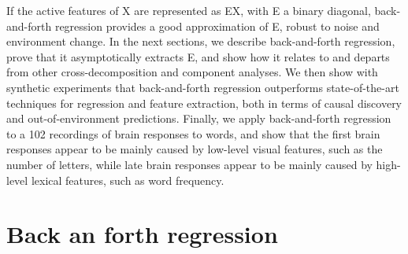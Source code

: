 \documentclass{article}
\begin{document}
%
If the active features of X are represented as EX, with E a binary diagonal, back-and-forth regression provides a good approximation of E, robust to noise and environment change.
%
In the next sections, we describe back-and-forth regression, prove that it asymptotically extracts E, and show how it relates to and departs from other cross-decomposition and component analyses. We then show with synthetic experiments that back-and-forth regression outperforms state-of-the-art techniques for regression and feature extraction, both in terms of causal discovery and out-of-environment predictions. Finally, we apply back-and-forth regression to a 102 recordings of brain responses to words, and show that the first brain responses appear to be mainly caused by low-level visual features, such as the number of letters, while late brain responses appear to be mainly caused by high-level lexical features, such as word frequency.
%

\section{Back an forth regression}
\end{document}
